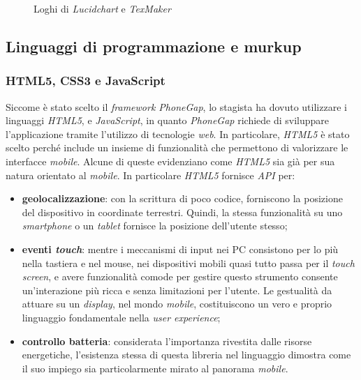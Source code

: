 \begin{figure}[!h] 
    \centering 
    \caption{Loghi di \textit{Lucidchart} e \textit{TexMaker}}
\end{figure}

\subsection{Linguaggi di programmazione e murkup}

\subsubsection{HTML5, CSS3 e JavaScript}

Siccome è stato scelto il \textit{framework PhoneGap}, lo stagista ha dovuto utilizzare i linguaggi \textit{HTML5},  e \textit{JavaScript}, in quanto \textit{PhoneGap} richiede di sviluppare l'applicazione tramite l'utilizzo di tecnologie \textit{web}. In particolare, \textit{HTML5} è stato scelto perché include un insieme di funzionalità che permettono di valorizzare le interfacce \textit{mobile}. Alcune di queste evidenziano come \textit{HTML5} sia già per sua natura orientato al \textit{mobile}. In particolare \textit{HTML5} fornisce \textit{API} per:
\begin{itemize}
	\item \textbf{geolocalizzazione}: con la scrittura di poco codice, forniscono la posizione del dispositivo in coordinate terrestri. Quindi, la stessa funzionalità su uno \textit{smartphone} o un \textit{tablet} fornisce la posizione dell'utente stesso;
	\item \textbf{eventi \textit{touch}}: mentre i meccanismi di input nei PC consistono per lo più nella tastiera e nel mouse, nei dispositivi mobili quasi tutto passa per il \textit{touch screen}, e avere funzionalità comode per gestire questo strumento consente un'interazione più ricca e senza limitazioni per l'utente. Le gestualità da attuare su un \textit{display}, nel mondo \textit{mobile}, costituiscono un vero e proprio linguaggio fondamentale nella \textit{user experience};
	\item \textbf{controllo batteria}: considerata l'importanza rivestita dalle risorse energetiche, l'esistenza stessa di questa libreria nel linguaggio dimostra come il suo impiego sia particolarmente mirato al panorama \textit{mobile}.
\end{itemize}

